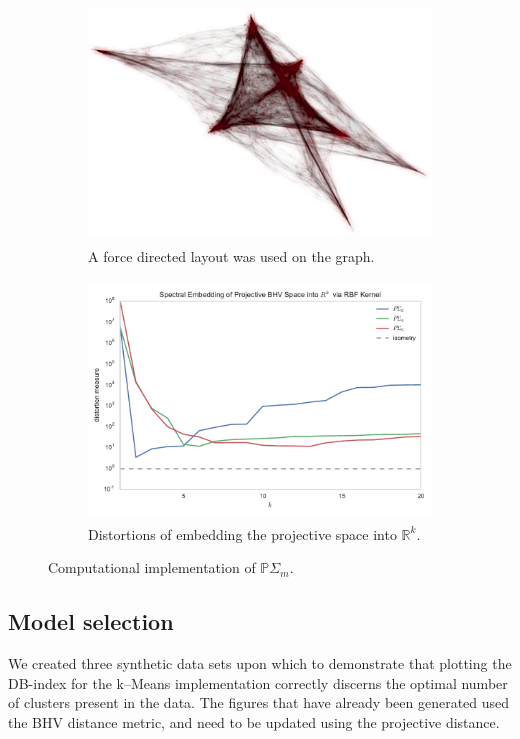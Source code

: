\documentclass[a4paper,11pt]{article}
\begin{document}
\begin{figure}
    \begin{subfigure}{\linewidth}
    \centering
    \includegraphics[height=2.5in]{figures/synthetic_graph_layout.png}
    \caption{A force directed layout was used on the graph.}
    \end{subfigure}
   
    \begin{subfigure}{\linewidth}
    \centering
    \includegraphics[height=2.5in]{figures/synthetic_distortion.pdf}
    \caption{Distortions of embedding the projective space into $\mathbb{R}^k$.}
    \end{subfigure}

    \caption{Computational implementation of $\mathbb{P}\Sigma_m$.}
     \label{fig:discretization}
\end{figure}

\subsection{Model selection}

We created three synthetic data sets upon which to demonstrate that plotting the DB-index for the k--Means implementation correctly discerns the optimal number of clusters present in the data.
The figures that have already been generated used the BHV distance metric, and need to be updated using the projective distance.
\end{document}
